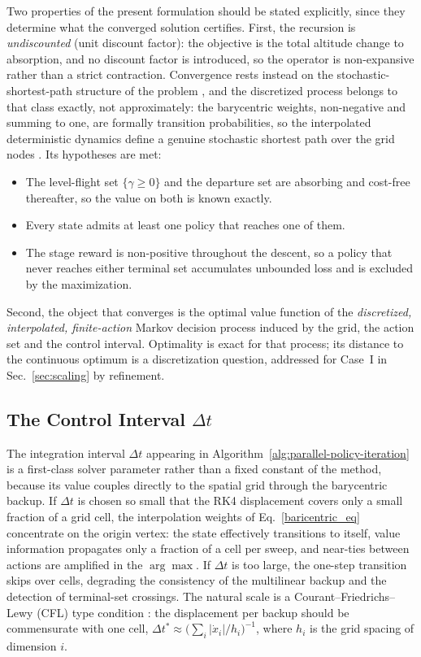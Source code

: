 \documentclass[journal ]{new-aiaa}
\begin{document}
Two properties of the present formulation should be stated explicitly, since they determine what the converged solution certifies. First, the recursion is \emph{undiscounted} (unit discount factor): the objective is the total altitude change to absorption, and no discount factor is introduced, so the operator is non-expansive rather than a strict contraction. Convergence rests instead on the stochastic-shortest-path structure of the problem \cite{Bertsekas2017}, and the discretized process belongs to that class exactly, not approximately: the barycentric weights, non-negative and summing to one, are formally transition probabilities, so the interpolated deterministic dynamics define a genuine stochastic shortest path over the grid nodes \cite{Munos1998}. Its hypotheses are met:
\begin{itemize}
    \item The level-flight set $\{\gamma \ge 0\}$ and the departure set are absorbing and cost-free thereafter, so the value on both is known exactly.
    \item Every state admits at least one policy that reaches one of them.
    \item The stage reward is non-positive throughout the descent, so a policy that never reaches either terminal set accumulates unbounded loss and is excluded by the maximization.
\end{itemize}
Second, the object that converges is the optimal value function of the \emph{discretized, interpolated, finite-action} Markov decision process induced by the grid, the action set and the control interval. Optimality is exact for that process; its distance to the continuous optimum is a discretization question, addressed for Case~I in Sec.~\ref{sec:scaling} by refinement.

\subsection{The Control Interval $\Delta t$}
\label{sec:delta_t}
The integration interval $\Delta t$ appearing in
Algorithm~\ref{alg:parallel-policy-iteration} is a first-class solver
parameter rather than a fixed constant of the method, because its value
couples directly to the spatial grid through the barycentric backup.
If $\Delta t$ is chosen so small that the RK4 displacement covers only
a small fraction of a grid cell, the interpolation weights of
Eq.~\eqref{baricentric_eq} concentrate on the origin vertex: the state
effectively transitions to itself, value information propagates only a
fraction of a cell per sweep, and near-ties between actions are
amplified in the $\arg\max$. If $\Delta t$ is too large, the one-step
transition skips over cells, degrading the consistency of the
multilinear backup and the detection of terminal-set crossings. The
natural scale is a Courant--Friedrichs--Lewy (CFL) type condition
\cite{Courant1967}: the displacement per backup
should be commensurate with one cell,
$\Delta t^\ast \approx \bigl(\sum_i |\dot{x}_i| / h_i\bigr)^{-1}$,
where $h_i$ is the grid spacing of dimension $i$.
\end{document}
